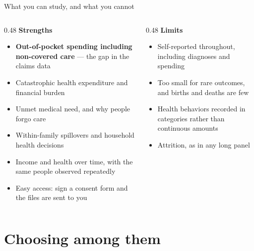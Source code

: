 \documentclass[aspectratio=169,11pt]{beamer}
\newcommand{\hl}[1]{\textbf{\color{kdgreen}#1}}
\begin{document}
\begin{frame}{What you can study, and what you cannot}
  \begin{columns}[T]
    \begin{column}{0.48\textwidth}
      \textbf{\color{kdgreen}Strengths}
      \begin{itemize}\small
        \setlength{\itemsep}{6pt}
        \item \hl{Out-of-pocket spending including non-covered care} --- the gap in
              the claims data
        \item Catastrophic health expenditure and financial burden
        \item Unmet medical need, and why people forgo care
        \item Within-family spillovers and household health decisions
        \item Income and health over time, with the same people observed repeatedly
        \item Easy access: sign a consent form and the files are sent to you
      \end{itemize}
    \end{column}
    \begin{column}{0.48\textwidth}
      \textbf{\color{kdaccent}Limits}
      \begin{itemize}\small
        \setlength{\itemsep}{6pt}
        \item Self-reported throughout, including diagnoses and spending
        \item Too small for rare outcomes, and births and deaths are few
        \item Health behaviors recorded in categories rather than continuous amounts
        \item Attrition, as in any long panel
      \end{itemize}
    \end{column}
  \end{columns}
\end{frame}

\section{Choosing among them}
\end{document}
